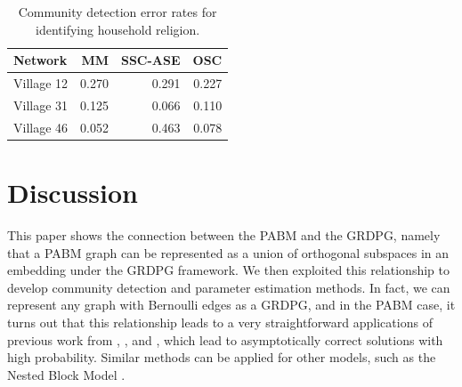 \documentclass[12pt]{article}
\begin{document}
\begin{table}

\caption{\label{tab:unnamed-chunk-8}Community detection error rates for identifying household religion.}
\centering
\begin{tabular}[t]{l|r|r|r}
\hline
Network & MM & SSC-ASE & OSC\\
\hline
Village 12 & 0.270 & 0.291 & 0.227\\
\hline
Village 31 & 0.125 & 0.066 & 0.110\\
\hline
Village 46 & 0.052 & 0.463 & 0.078\\
\hline
\end{tabular}
\end{table}

\hypertarget{discussion}{%
\section{Discussion}\label{discussion}}

This paper shows the connection between the PABM and the GRDPG, namely
that a PABM graph can be represented as a union of orthogonal subspaces
in an embedding under the GRDPG framework. We then exploited this
relationship to develop community detection and parameter estimation
methods. In fact, we can represent any graph with Bernoulli edges as a
GRDPG, and in the PABM case, it turns out that this relationship leads
to a very straightforward applications of previous work from
\citet{rubindelanchy2017statistical},
\citet{soltanolkotabi2012}, and \citet{jmlr-v28-wang13}, which
lead to asymptotically correct solutions with high probability. Similar
methods can be applied for other models, such as the Nested Block Model
\cite{noroozi2021hierarchy}.

\appendix
\renewcommand\refname{References}
  
\end{document}
